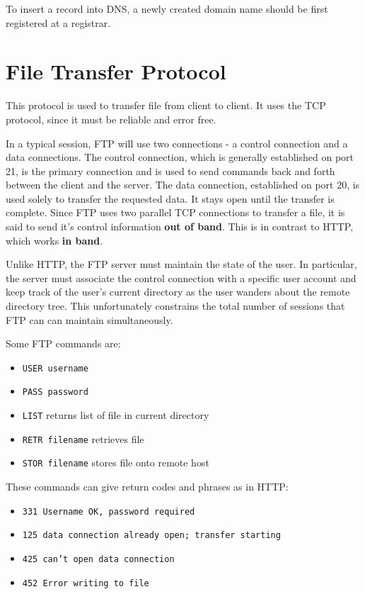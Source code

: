\documentclass[12pt,letterpaper]{amsbook}
\theoremstyle{definition}
\begin{document}
To insert a record into DNS, a newly created domain name should be first registered at a registrar.

\section{File Transfer Protocol}

This protocol is used to transfer file from client to client. It uses the TCP protocol, since it must be reliable and error free.

In a typical session, FTP will use two connections - a control connection and a data connections. The control connection, which is generally established on port 21, is the primary connection and is used to send commands back and forth between the client and the server. The data connection, established on port 20, is used solely to transfer the requested data. It stays open until the transfer is complete. Since FTP uses two parallel TCP connections to transfer a file, it is said to send it's control information \textbf{out of band}. This is in contrast to HTTP, which works \textbf{in band}. 

Unlike HTTP, the FTP server must maintain the state of the user. In particular, the server must associate the control connection with a specific user account and keep track of the user's current directory as the user wanders about the remote directory tree. This unfortunately constrains the total number of sessions that FTP can can maintain simultaneously.

Some FTP commands are:

\begin{itemize}
  \item \texttt{USER username} 
  \item \texttt{PASS password} 
  \item \texttt{LIST} returns list of file in current directory
  \item \texttt{RETR filename} retrieves file
  \item \texttt{STOR filename} stores file onto remote host
\end{itemize}

These commands can give return codes and phrases as in HTTP:

\begin{itemize}
  \item \texttt{331 Username OK, password required}
  \item \texttt{125 data connection already open; transfer starting}
  \item \texttt{425 can't open data connection}
  \item \texttt{452 Error writing to file}
\end{itemize}
\end{document}
